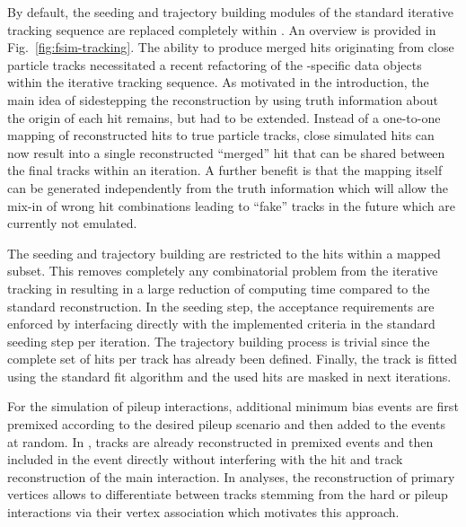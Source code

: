 By default, the seeding and trajectory building modules of the standard iterative tracking sequence are replaced completely within \FSIM. An overview is provided in Fig.~\ref{fig:fsim-tracking}. The ability to produce merged hits originating from close particle tracks necessitated a recent refactoring of the \FSIM{}-specific data objects within the iterative tracking sequence. As motivated in the introduction, the main idea of sidestepping the reconstruction by using truth information about the origin of each hit remains, but had to be extended. Instead of a one-to-one mapping of reconstructed hits to true particle tracks, close simulated hits can now result into a single reconstructed ``merged'' hit that can be shared between the final tracks within an iteration. A further benefit is that the mapping itself can be generated independently from the truth information which will allow the mix-in of wrong hit combinations leading to ``fake'' tracks in the future which are currently not emulated.


The seeding and trajectory building are restricted to the hits within a mapped subset. This removes completely any combinatorial problem from the iterative tracking in \FSIM resulting in a large reduction of computing time compared to the standard reconstruction. In the seeding step, the acceptance requirements are enforced by interfacing directly with the implemented criteria in the standard seeding step per iteration. The trajectory building process is trivial since the complete set of hits per track has already been defined. Finally, the track is fitted using the standard fit algorithm and the used hits are masked in next iterations.

For the simulation of pileup interactions, additional minimum bias events are first premixed according to the desired pileup scenario and then added to the events at random. In \FSIM, tracks are already reconstructed in premixed events and then included in the event directly without interfering with the hit and track reconstruction of the main interaction. In analyses, the reconstruction of primary vertices allows to differentiate between tracks stemming from the hard or pileup interactions via their vertex association which motivates this approach.


